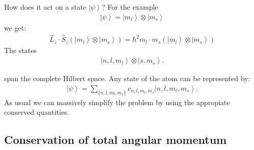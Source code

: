 \documentclass[10pt]{article}
\newcommand{\ket}[1]{\ensuremath{\left|#1\right\rangle}}
\begin{document}
How does it act on a state $\ket{\psi}$? For the example 
\begin{align}
\ket{\psi} = \ket{m_l} \otimes \ket{m_s}
\end{align}
we get:
\begin{align}
\hat{L}_z \cdot \hat{S}_z \left( \ket{m_l} \otimes \ket{m_s} \right)
= \hbar^2 m_l \cdot m_s (\ket{m_l} \otimes \ket{m_s})
\end{align}
The states
%
\begin{align}
\ket{n,l,m_l} \otimes \ket{s,m_s}. 
\end{align}
%

span the complete Hilbert space. Any state of the atom can be represented by:
%
\begin{align}
\ket{\psi} = \sum_{\{n,l,m_l,m_s\}} c_{n,l,m_l,m_s} \ket{n,l,m_l,m_s}.
\end{align}
%
As usual we can massively simplify the problem by using the appropiate conserved quantities.



\subsection{Conservation of total angular momentum}
\end{document}
